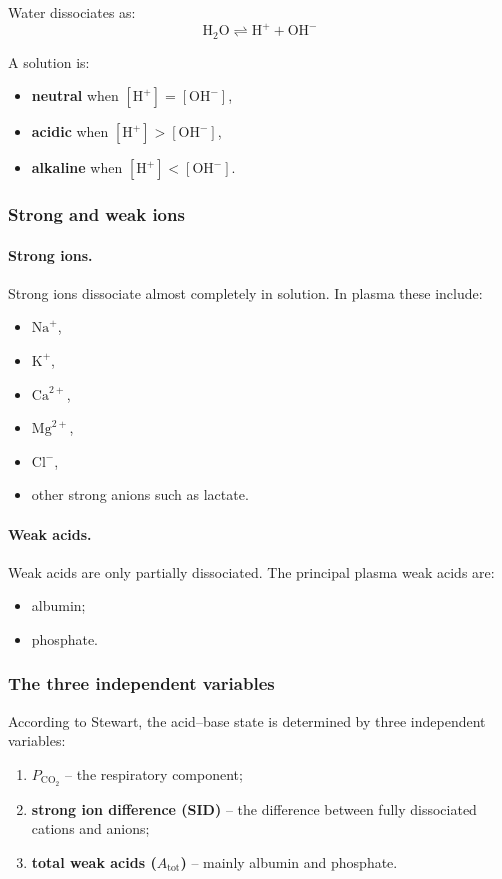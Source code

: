 \documentclass[11pt,a4paper]{article}
\begin{document}
Water dissociates as:
\[
\mathrm{H_2O} \rightleftharpoons \mathrm{H}^+ + \mathrm{OH}^-
\]

A solution is:
\begin{itemize}
    \item \textbf{neutral} when \([\mathrm{H}^+] = [\mathrm{OH}^-]\),
    \item \textbf{acidic} when \([\mathrm{H}^+] > [\mathrm{OH}^-]\),
    \item \textbf{alkaline} when \([\mathrm{H}^+] < [\mathrm{OH}^-]\).
\end{itemize}

\subsubsection{Strong and weak ions}

\paragraph{Strong ions.}
Strong ions dissociate almost completely in solution. In plasma these include:
\begin{itemize}
    \item \(\mathrm{Na}^+\),
    \item \(\mathrm{K}^+\),
    \item \(\mathrm{Ca}^{2+}\),
    \item \(\mathrm{Mg}^{2+}\),
    \item \(\mathrm{Cl}^-\),
    \item other strong anions such as lactate.
\end{itemize}

\paragraph{Weak acids.}
Weak acids are only partially dissociated. The principal plasma weak acids are:
\begin{itemize}
    \item albumin;
    \item phosphate.
\end{itemize}

\subsubsection{The three independent variables}

According to Stewart, the acid--base state is determined by three independent variables:
\begin{enumerate}[label=\arabic*.]
    \item \textbf{\(P_{\mathrm{CO_2}}\)} -- the respiratory component;
    \item \textbf{strong ion difference (SID)} -- the difference between fully dissociated cations and anions;
    \item \textbf{total weak acids (\(A_{\mathrm{tot}}\))} -- mainly albumin and phosphate.
\end{enumerate}
\end{document}
